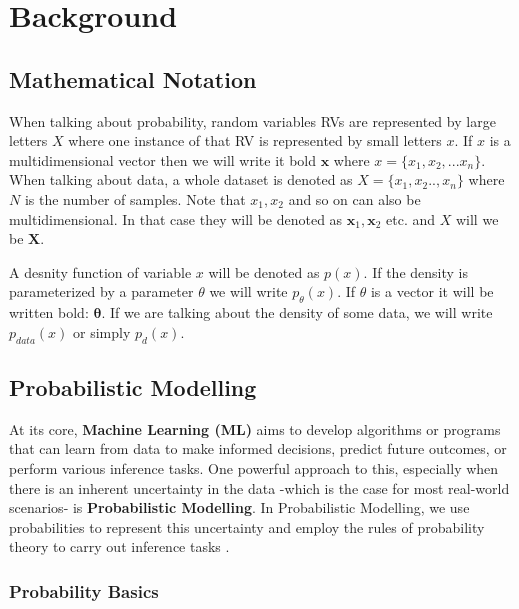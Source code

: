 \usetikzlibrary{calc}

\renewcommand{\vec}[1]{\textbf{#1}}
\newcommand{\norm}[1]{\left\lVert#1\right\rVert}


\chapter{Background}
\label{cha:background}

\section{Mathematical Notation}

When talking about probability, random variables RVs are represented by large letters $X$ where one instance of that RV is represented 
by small letters $x$. If $x$ is a multidimensional vector then we will write it bold $\vec x$ where $x = \{x_1, x_2, ... x_n\}$. 
When talking about data, a whole dataset is denoted as $X = \{x_1, x_2 .. , x_n\}$ where $N$ is the number of samples. 
Note that $x_1, x_2$ and so on can also be multidimensional. In that case they will be denoted as $\vec x_1, \vec x_2$ etc. and $X$ will we be $\vec X$.

A desnity function of variable $x$ will be denoted as $p(x)$. If the density is parameterized by a parameter $\theta$ we will write 
$p_\theta(x)$. If $\theta$ is a vector it will be written bold: $\boldsymbol{\theta}$.
If we are talking about the density of some data, we will write $p_{data}(x)$ or simply $p_d(x)$.

\section{Probabilistic Modelling}
\label{sec:pm}

At its core, \textbf{Machine Learning (ML)} aims to develop algorithms or programs that can learn from data to make informed decisions, predict future outcomes, or perform various inference tasks. 
One powerful approach to this, especially when there is an inherent 
uncertainty in the data -which is the case for most real-world scenarios- is \textbf{Probabilistic Modelling}.
In Probabilistic Modelling, we use probabilities to represent this uncertainty and employ the rules of probability theory to carry out inference tasks \cite{pc_intro}.

\subsection{Probability Basics}
\label{sec:prob_basics}

